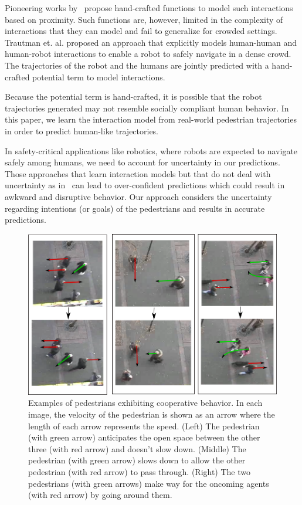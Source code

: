 Pioneering works by~\cite{helbing95,hall63} propose hand-crafted
functions to model such interactions based on proximity. Such
functions are, however, limited in the complexity of interactions that
they can model and fail to generalize for crowded settings. Trautman
et. al. \cite{trautman10} proposed an approach that explicitly models
human-human and human-robot interactions to enable a robot to safely
navigate in a dense crowd. The trajectories of the robot and the
humans are jointly predicted with a hand-crafted potential term to
model interactions.

Because the potential term is hand-crafted, it is possible that the
robot trajectories generated may not resemble socially compliant human
behavior.  In this paper, we learn the interaction model from
real-world pedestrian trajectories in order to predict human-like
trajectories.


In safety-critical applications like robotics, where robots are
expected to navigate safely among humans, we need to account for
uncertainty in our predictions. Those approaches that learn
interaction models but that do not deal with uncertainty as
in~\cite{alahi16} can lead to over-confident predictions which could
result in awkward and disruptive behavior. Our approach considers the
uncertainty regarding intentions (or goals) of the pedestrians and
results in accurate predictions.

\begin{figure}[t!]
  \centering
  \includegraphics[width=\linewidth]{Figures/drawing-horizontal.png}
  \caption{Examples of pedestrians exhibiting cooperative behavior. In
    each image, the velocity of the pedestrian is shown as an arrow
    where the length of each arrow represents the speed. (Left) The
    pedestrian (with green arrow) anticipates the open space between
    the other three (with red arrow) and doesn't slow down. (Middle)
    The pedestrian (with green arrow) slows down to allow the other
    pedestrian (with red arrow) to pass through. (Right) The two
    pedestrians (with green arrows) make way for the oncoming agents
    (with red arrow) by going around them.}
  \label{fig:oigp-intro}
\end{figure}




